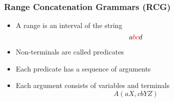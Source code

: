 \documentclass{beamer}
\begin{document}
\begin{frame}
    \frametitle{Range Concatenation Grammars (RCG)}

    \begin{itemize}
        \item A range is an interval of the string
              $$a\textcolor{red}{bc}d$$
              \pause
        \item Non-terminals are called predicates
              \pause
        \item Each predicate has a sequence of arguments
              \pause
        \item Each argument consists of variables and terminals
              $$A(aX,cbYZ)$$
    \end{itemize}
\end{frame}
\end{document}

